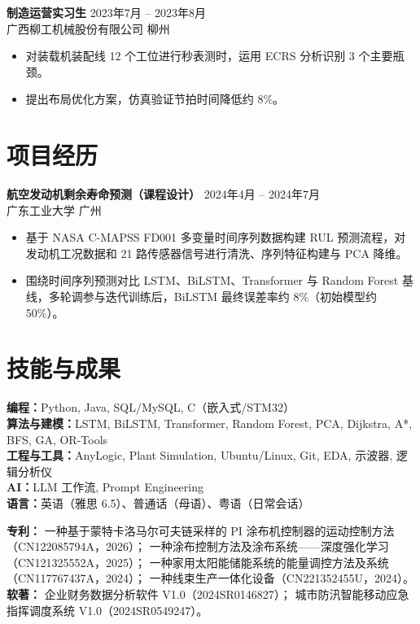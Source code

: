 \documentclass[10pt,a4paper]{article}
\newcommand{\resumeItem}[1]{\item #1}
\newcommand{\experienceEntry}[4]{%
  \textbf{#1} \hfill #2 \\
  {\small #3} \hfill {\small #4}%
}
\begin{document}
\experienceEntry{制造运营实习生}{2023年7月 -- 2023年8月}{广西柳工机械股份有限公司}{柳州}
\begin{itemize}
  \resumeItem{对装载机装配线 12 个工位进行秒表测时，运用 ECRS 分析识别 3 个主要瓶颈。}
  \resumeItem{提出布局优化方案，仿真验证节拍时间降低约 8\%。}
\end{itemize}

\section{项目经历}

\experienceEntry{航空发动机剩余寿命预测（课程设计）}{2024年4月 -- 2024年7月}{广东工业大学}{广州}
\begin{itemize}
  \resumeItem{基于 NASA C-MAPSS FD001 多变量时间序列数据构建 RUL 预测流程，对发动机工况数据和 21 路传感器信号进行清洗、序列特征构建与 PCA 降维。}
  \resumeItem{围绕时间序列预测对比 LSTM、BiLSTM、Transformer 与 Random Forest 基线，多轮调参与迭代训练后，BiLSTM 最终误差率约 8\%（初始模型约 50\%）。}
\end{itemize}

\section{技能与成果}

\textbf{编程：}Python, Java, SQL/MySQL, C（嵌入式/STM32） \\
\textbf{算法与建模：}LSTM, BiLSTM, Transformer, Random Forest, PCA, Dijkstra, A*, BFS, GA, OR-Tools \\
\textbf{工程与工具：}AnyLogic, Plant Simulation, Ubuntu/Linux, Git, EDA, 示波器, 逻辑分析仪 \\
\textbf{AI：}LLM 工作流, Prompt Engineering \\
\textbf{语言：}英语（雅思 6.5）、普通话（母语）、粤语（日常会话）

\vspace{2pt}

\textbf{专利：}
一种基于蒙特卡洛马尔可夫链采样的 PI 涂布机控制器的运动控制方法（CN122085794A，2026）；
一种涂布控制方法及涂布系统——深度强化学习（CN121325552A，2025）；
一种家用太阳能储能系统的能量调控方法及系统（CN117767437A，2024）；
一种线束生产一体化设备（CN221352455U，2024）。\\
\textbf{软著：}
企业财务数据分析软件 V1.0（2024SR0146827）；
城市防汛智能移动应急指挥调度系统 V1.0（2024SR0549247）。
\end{document}
